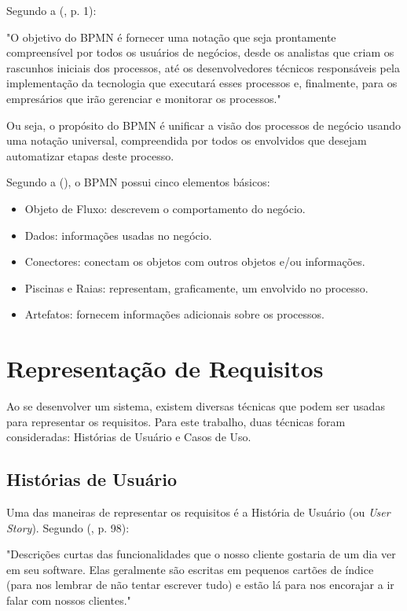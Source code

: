 Segundo a \citeauthor{bpmn2013} (\citeyear{bpmn2013}, p. 1):

\begin{citacaoLonga}
"O objetivo do BPMN é fornecer uma notação que seja prontamente compreensível por todos os usuários de negócios, desde os analistas que criam os rascunhos iniciais dos processos, até os desenvolvedores técnicos responsáveis pela implementação da tecnologia que executará esses processos e, finalmente, para os empresários que irão gerenciar e monitorar os processos."
\end{citacaoLonga}

Ou seja, o propósito do BPMN é unificar a visão dos processos de negócio usando uma notação universal, compreendida por todos os envolvidos que desejam automatizar etapas deste processo.

Segundo a \citeauthor{bpmn2013} (\citeyear{bpmn2013}), o BPMN possui cinco elementos básicos:

\begin{itemize}
    \item Objeto de Fluxo: descrevem o comportamento do negócio.
    \item Dados: informações usadas no negócio.
    \item Conectores: conectam os objetos com outros objetos e/ou informações.
    \item Piscinas e Raias: representam, graficamente, um envolvido no processo.
    \item Artefatos: fornecem informações adicionais sobre os processos.
\end{itemize}

\section{Representação de Requisitos}
Ao se desenvolver um sistema, existem diversas técnicas que podem ser usadas para representar os requisitos. Para este trabalho, duas técnicas foram consideradas: Histórias de Usuário e Casos de Uso.

\subsection{Histórias de Usuário}
Uma das maneiras de representar os requisitos é a História de Usuário (ou \textit{User Story}). Segundo  (\citeyear{jonathanrasmusson}, p. 98):

\begin{citacaoLonga}
"Descrições curtas das funcionalidades que o nosso cliente
gostaria de um dia ver em seu software. Elas geralmente são escritas em pequenos cartões de índice (para nos lembrar de não tentar escrever tudo) e estão lá para nos encorajar a ir falar com nossos clientes."
\end{citacaoLonga}

